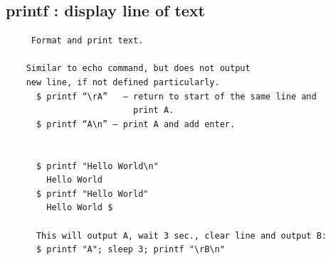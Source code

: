 \documentclass[a4paper,12pt]{article}
\begin{document}
\subsection{printf     : display line of text}
\begin{verbatim}
     Format and print text.

    Similar to echo command, but does not output 
    new line, if not defined particularly.
      $ printf “\rA”   – return to start of the same line and 
                         print A.
﻿      $ printf “A\n” – print A and add enter.


      $ printf "Hello World\n"
        Hello World
      $ printf "Hello World"
        Hello World $
       
      This will output A, wait 3 sec., clear line and output B:
      $ printf "A"; sleep 3; printf "\rB\n"
      
           
\end{verbatim}
\end{document}
